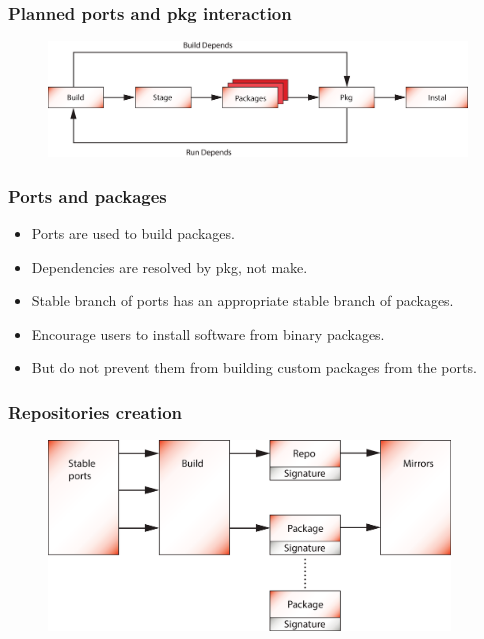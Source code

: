 \documentclass{beamer}
\begin{document}
\begin{frame}
\frametitle{Planned ports and pkg interaction}
\begin{figure}[h!]
  \centering
  \includegraphics[width=0.99\textwidth]{q2.eps}
\end{figure}
\end{frame}

\begin{frame}
\frametitle{Ports and packages}
\begin{itemize}
  \item Ports are used to build packages.
  \item Dependencies are resolved by pkg, not make.
  \item Stable branch of ports has an appropriate stable branch of packages.
  \item Encourage users to install software from binary packages.
  \item But do not prevent them from building custom packages from the ports.
\end{itemize} 
\end{frame}

\begin{frame}
\frametitle{Repositories creation}
\begin{figure}[h!]
  \centering
  \includegraphics[width=0.95\textwidth]{q3.eps}
\end{figure}
\end{frame}
\end{document}
